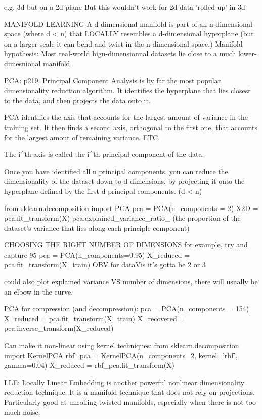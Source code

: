 e.g. 3d but on a 2d plane
But this wouldn't work for 2d data 'rolled up' in 3d

MANIFOLD LEARNING
A d-dimensional manifold is part of an n-dimensional space (where d < n)
that LOCALLY resembles a d-dimensional hyperplane
(but on a larger scale it can bend and twist in the n-dimensional space.)
Manifold hypothesis:
Most real-world hign-dimensionnal datasets lie close to a much lower-dimesnional manifold.

PCA: p219.
Principal Component Analysis is by far the most popular dimensionality reduction algorithm.
It identifies the hyperplane that lies closest to the data,
and then projects the data onto it.

PCA identifies the axis that accounts for the largest amount of variance in the training set.
It then finds a second axis, orthogonal to the first one,
that accounts for the largest amout of remaining variance. ETC.

The i^th axis is called the i^th principal component of the data.

Once you have identified all n principal components,
you can reduce the dimensionality of the dataset down to d dimensions,
by projecting it onto the hyperplane defined by the first d principal components. (d < n)

from sklearn.decomposition import PCA
pca = PCA(n_components = 2)
X2D = pca.fit_transform(X)
pca.explained_variance_ratio_ (the proportion of the dataset's variance that lies along each principle component)

CHOOSING THE RIGHT NUMBER OF DIMENSIONS
for example, try and capture 95%
pca = PCA(n_components=0.95)
X_reduced = pca.fit_transform(X_train)
OBV for dataVis it's gotta be 2 or 3

could also plot explained variance VS number of dimensions,
there will usually be an elbow in the curve.

PCA for compression (and decompression):
pca = PCA(n_components = 154)
X_reduced = pca.fit_transform(X_train)
X_recovered = pca.inverse_transform(X_reduced)

Can make it non-linear using kernel techniques:
from sklearn.decomposition import KernelPCA
rbf_pca = KernelPCA(n_components=2, kernel='rbf', gamma=0.04)
X_reduced = rbf_pca.fit_transform(X)

LLE: Locally Linear Embedding
is another powerful nonlinear dimensionality reduction technique.
It is a manifold technique that does not rely on projections.
Particularly good at unrolling twisted manifolds, especially when there is not too much noise.

